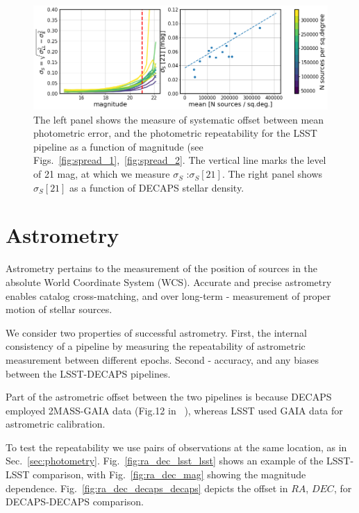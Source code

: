 \documentclass[DM,lsstdraft,toc,usenatbib]{lsstdoc}
\begin{document}
\begin{figure}
\begin{centering}
\includegraphics[width=0.95\columnwidth]{figs/photometric_offset_combined.png}
\caption{The left panel shows the measure of systematic offset between mean photometric error, and the photometric repeatability for the LSST pipeline as a function of magnitude (see Figs.~\ref{fig:spread_1},~\ref{fig:spread_2}. The vertical line marks the level of 21 mag, at which we measure $\sigma_{S}$ :$\sigma_{S}[21]$. The right panel shows $\sigma_{S}[21]$  as a function of DECAPS stellar density.}
\label{fig:spread_summary}
\end{centering}
\end{figure} 


\section{Astrometry}
\label{sec:astrometry}
Astrometry pertains to the measurement of the position of sources in the absolute World Coordinate System (WCS). Accurate and precise astrometry enables catalog cross-matching, and over long-term - measurement of proper motion of stellar sources. 

We consider two properties of successful astrometry. First, the internal consistency of a pipeline by measuring the repeatability of astrometric measurement between different epochs.  Second - accuracy, and any biases between the LSST-DECAPS pipelines. 

Part of the astrometric offset between the two pipelines is because  DECAPS employed 2MASS-GAIA data (Fig.12 in ~\cite{schlafly2017}), whereas LSST used GAIA data for astrometric calibration. 

To test the repeatability we use pairs of observations at the same location, as in Sec.~\ref{sec:photometry}. Fig.~\ref{fig:ra_dec_lsst_lsst} shows an example of the LSST-LSST comparison, with Fig.~\ref{fig:ra_dec_mag} showing the magnitude dependence. Fig.~\ref{fig:ra_dec_decaps_decaps} depicts the offset in $RA$, $DEC$, for DECAPS-DECAPS comparison. 
\end{document}
